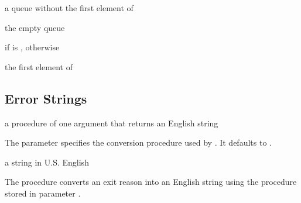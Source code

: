 \begin{procedure}
\end{procedure}
\returns{} a queue without the first element of 

\begin{syntax}
\end{syntax}
\returns{} the empty queue

\begin{procedure}
\end{procedure}
\returns{}  if  is ,  otherwise

\begin{procedure}
\end{procedure}
\returns{} the first element of 

\subsection{Error Strings}

\begin{parameter}
\end{parameter}
\hasvalue{} a procedure of one argument that returns an English string

The  parameter specifies the
conversion procedure used by . It defaults
to .

\begin{procedure}
\end{procedure}
\returns{} a string in U.S. English

The  procedure converts an exit reason into
an English string using the procedure stored in parameter
.

